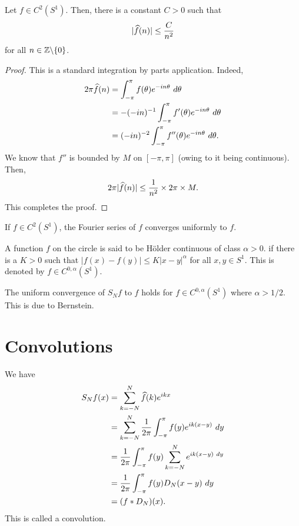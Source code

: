 \begin{proposition}
    Let $f\in C^2(S^1)$. Then, there is a constant $C > 0$ such that 
    \begin{equation*}
        |\widehat{f}(n)|\le\frac{C}{n^2}
    \end{equation*}
    for all $n\in\mathbb{Z}\backslash\{0\}$.
\end{proposition}
\begin{proof}
    This is a standard integration by parts application. Indeed, 
    \begin{align*}
        2\pi\widehat{f}(n) &= \int_{-\pi}^{\pi}f(\theta)e^{-in\theta}~d\theta\\
        &= -(-in)^{-1}\int_{-\pi}^{\pi}f'(\theta)e^{-in\theta}~d\theta\\
        &= (-in)^{-2}\int_{-\pi}^{\pi}f''(\theta)e^{-in\theta}~d\theta.
    \end{align*}
    We know that $f''$ is bounded by $M$ on $[-\pi, \pi]$ (owing to it being continuous). Then, 
    \begin{equation*}
        2\pi|\widehat{f}(n)|\le \frac{1}{n^2}\times 2\pi\times M.
    \end{equation*}
    This completes the proof.
\end{proof}

\begin{corollary}
    If $f\in C^2(S^1)$, the Fourier series of $f$ converges uniformly to $f$.
\end{corollary}

\begin{definition}
    A function $f$ on the circle is said to be H\"older continuous of class $\alpha > 0$. if there is a $K > 0$ such that $|f(x) - f(y)|\le K|x - y|^\alpha$ for all $x,y\in S^1$. This is denoted by $f\in C^{0,\alpha}(S^1)$.
\end{definition}

\begin{remark}
    The uniform convergence of $S_Nf$ to $f$ holds for $f\in C^{0,\alpha}(S^1)$ where $\alpha > 1/2$. This is due to Bernstein.
\end{remark}

\section{Convolutions}

We have 
\begin{align*}
    S_Nf(x) &= \sum_{k = -N}^N \widehat{f}(k)e^{ikx}\\
    &= \sum_{k = -N}^N \frac{1}{2\pi}\int_{-\pi}^\pi f(y)e^{ik(x - y)}~dy\\
    &= \frac{1}{2\pi}\int_{-\pi}^{\pi}f(y)\sum_{k = -N}^Ne^{ik(x - y)~dy}\\
    &= \frac{1}{2\pi}\int_{-\pi}^{\pi}f(y)D_N(x - y)~dy\\
    &= (f\ast D_N)(x).
\end{align*}
This is called a convolution.

